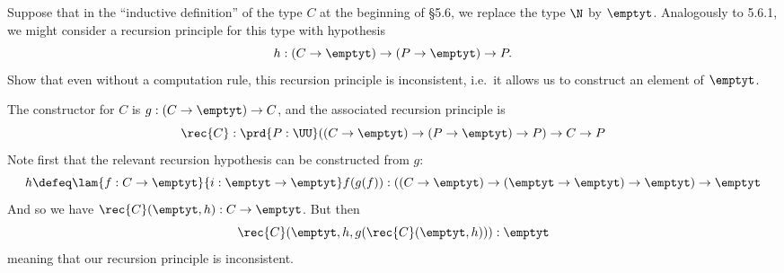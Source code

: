 Suppose that in the ``inductive definition'' of the type $C$ at the beginning
of \S5.6, we replace the type $\N$ by $\emptyt$.  Analogously to
5.6.1, we might consider a recursion principle for this type with hypothesis
\[
  h : (C \to \emptyt) \to (P \to \emptyt) \to P.
\]
Show that even without a computation rule, this recursion principle is
inconsistent, i.e.~it allows us to construct an element of $\emptyt$.


 \soln
The constructor for $C$ is $g : (C \to \emptyt) \to C$, and the associated
recursion principle is
\[
  \rec{C} : \prd{P:\UU} ((C \to \emptyt) \to (P \to \emptyt) \to P) \to C \to P
\]
Note first that the relevant recursion hypothesis can be constructed from $g$:
\[
  h
  \defeq \lam{f:C \to \emptyt}{i:\emptyt \to \emptyt}f(g(f))
  : ((C \to \emptyt) \to (\emptyt \to \emptyt) \to \emptyt) \to \emptyt
\]
And so we have $\rec{C}(\emptyt, h) : C \to \emptyt$.  But then
\[
  \rec{C}(\emptyt, h, g(\rec{C}(\emptyt, h))) : \emptyt
\]
meaning that our recursion principle is inconsistent.


